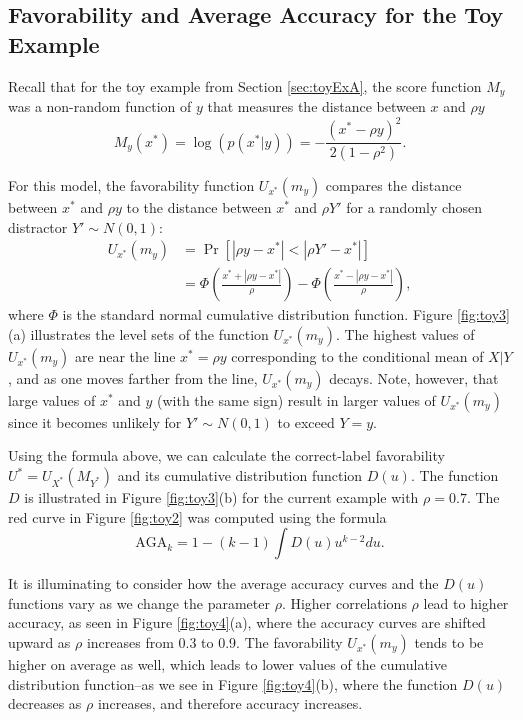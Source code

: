 \documentclass[twoside,11pt]{article}
\begin{document}
\subsection{Favorability and Average Accuracy for the Toy Example}

Recall that for the toy example from Section \ref{sec:toyExA}, the
score function $M_{y}$ was a non-random function of $y$ that measures
the distance between $x$ and $\rho y$
\[
M_{y}(x^*) = \log(p(x^*|y)) = -\frac{(x^* - \rho y)^2}{2(1-\rho^2)} .
\]

For this model, the favorability function $U_{x^*}(m_y)$ compares the
distance between $x^*$ and $\rho y$ to the distance between $x^*$ and
$\rho Y'$ for a randomly chosen distractor $ Y'\sim N(0,1)$:
\begin{align*}
U_{x^*}(m_y) &= \Pr[|\rho y - x^*|< |\rho Y' - x^*|] 
\\&= \Phi\left(\frac{x^* + |\rho y - x^*|}{\rho}\right) - \Phi\left(\frac{x^* - |\rho y - x^*|}{\rho}\right),
\end{align*}
where $\Phi$ is the standard normal cumulative distribution function.
Figure \ref{fig:toy3}(a) illustrates the level sets of the function
$U_{x^*}(m_y)$.  The highest values of $U_{x^*}(m_y)$ are near the
line $x^* = \rho y$ corresponding to the conditional mean of $X|Y$, and as
one moves farther from the line, $U_{x^*}(m_y)$ decays.  Note, however,
that large values of $x^*$ and $y$ (with the same sign) result in
larger values of $U_{x^*}(m_y)$ since it becomes unlikely for $Y' \sim
N(0,1)$ to exceed $Y = y$.

Using the formula above, we can calculate the correct-label
favorability $U^* = U_{X^*}(M_{Y^*})$ and its cumulative distribution
function ${D}(u)$.  The function ${D}$ is illustrated in Figure
\ref{fig:toy3}(b) for the current example with $\rho = 0.7$.  The red
curve in Figure \ref{fig:toy2} was computed using the formula
\[
\text{AGA}_k = 1-(k-1) \int {D}(u) u^{k-2} du.
\]

It is illuminating to consider how the average accuracy curves and the
${D}(u)$ functions vary as we change the parameter $\rho$.  Higher
correlations $\rho$ lead to higher accuracy, as seen in Figure
\ref{fig:toy4}(a), where the accuracy curves are shifted upward as
$\rho$ increases from 0.3 to 0.9.  The favorability $U_{x^*}(m_y)$
tends to be higher on average as well, which leads to lower values of
the cumulative distribution function--as we see in Figure
\ref{fig:toy4}(b), where the function ${D}(u)$ decreases as
$\rho$ increases, and therefore accuracy increases.
\end{document}
